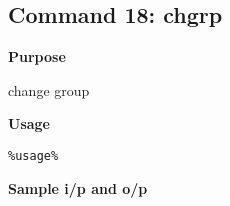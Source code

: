 \subsection{Command 18: chgrp} 
\textbf{Purpose}
\begin{flushleft}
 change group
\end{flushleft}
\textbf{Usage}
\begin{verbatim}
%usage%
\end{verbatim}
\textbf{Sample i/p and o/p}
\begin{figure}[H] 
\end{figure}

